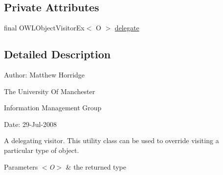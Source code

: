 \subsection*{Private Attributes}
\begin{DoxyCompactItemize}
\item 
final O\-W\-L\-Object\-Visitor\-Ex$<$ O $>$ \hyperlink{classorg_1_1semanticweb_1_1owlapi_1_1util_1_1_delegating_object_visitor_ex_3_01_o_01_4_a5d357422bfba7c8d47fd65eb2b96f076}{delegate}
\end{DoxyCompactItemize}


\subsection{Detailed Description}
Author\-: Matthew Horridge\par
 The University Of Manchester\par
 Information Management Group\par
 Date\-: 29-\/\-Jul-\/2008\par
\par
 

A delegating visitor. This utility class can be used to override visiting a particular type of object. 
\begin{DoxyParams}{Parameters}
{\em $<$\-O$>$} & the returned type \\
\hline
\end{DoxyParams}


